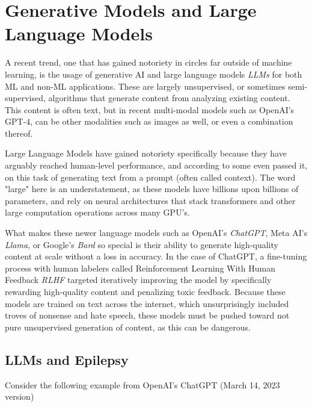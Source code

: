 
\section{Generative Models and Large Language Models}

A recent trend, one that has gained notoriety in circles far outside of machine learning, is the usage of generative AI
and large language models \textit{LLMs} for both ML and non-ML applications. These are largely unsupervised, or sometimes
semi-supervised, algorithms that generate content from analyzing existing content. This content is often text, but in recent
multi-modal models such as OpenAI's GPT-4, can be other modalities such as images as well, or  even a combination thereof.

Large Language Models have gained notoriety specifically because they have arguably reached human-level performance, and according
to some even passed it, on this task of generating text from a prompt (often called context). The word "large" here is an understatement,
as these models have billions upon billions of parameters, and rely on neural architectures that stack transformers and other large
computation operations across many GPU's.

What makes these newer language models such as OpenAI's \textit{ChatGPT}, Meta AI's \textit{Llama}, or Google's \textit{Bard} so special
is their ability to generate high-quality content at scale without a loss in accuracy. In the case of ChatGPT, a fine-tuning process with
human labelers called Reinforcement Learning With Human Feedback \textit{RLHF} targeted iteratively improving the model by specifically
rewarding high-quality content and penalizing toxic feedback. Because these models are trained on text across the internet, which
unsurprisingly included troves of nonsense and hate speech, these models must be pushed toward not pure unsupervised generation of content,
as this can be dangerous.

\subsection{LLMs and Epilepsy}

Consider the following example from OpenAI's ChatGPT (March 14, 2023 version)


